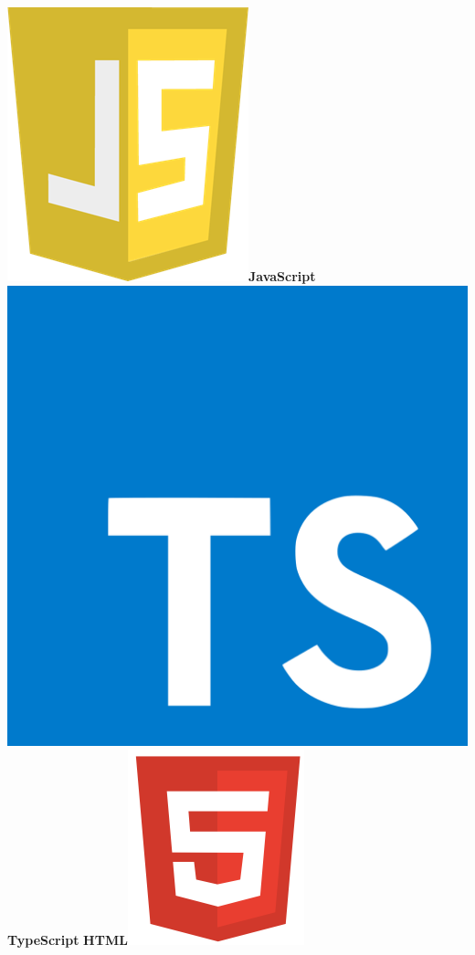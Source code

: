 \documentclass[a4paper]{./classes/friggeri-cv}
\begin{document}
\begin{aside}
        \includegraphics[scale=0.037]{../assets/images/icons/JavaScript_icon.png}\textbf{JavaScript}
        \includegraphics[scale=0.0085]{../assets/images/logos/TypeScript_logo.png}\textbf{TypeScript}
        \textbf{HTML}\includegraphics[scale=0.05]{../assets/images/icons/HTML_icon.png}

\end{aside}
\end{document}
